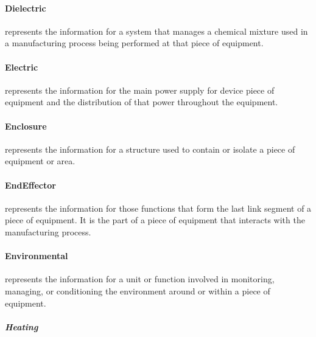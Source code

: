 \paragraph{Dielectric}\mbox{}
\label{sec:Dielectric}


 represents the information for a system that manages a chemical mixture used in a manufacturing process being performed at that piece of equipment.



\paragraph{Electric}\mbox{}
\label{sec:Electric}


 represents the information for the main power supply for device piece of equipment and the distribution of that power throughout the equipment.



\paragraph{Enclosure}\mbox{}
\label{sec:Enclosure}


 represents the information for a structure used to contain or isolate a piece of equipment or area.



\paragraph{EndEffector}\mbox{}
\label{sec:EndEffector}


 represents the information for those functions that form the last link segment of a piece of equipment. It is the part of a piece of equipment that interacts with the manufacturing process.



\paragraph{Environmental}\mbox{}
\label{sec:Environmental}


 represents the information for a unit or function involved in monitoring, managing, or conditioning the environment around or within a piece of equipment.



\subparagraph{Heating}\mbox{}
\label{sec:Heating}


